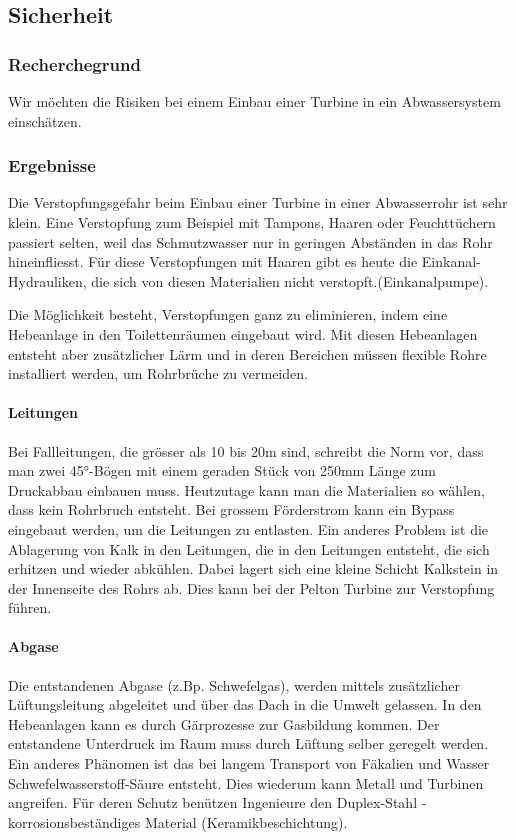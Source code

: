 \subsection{Sicherheit}


\subsubsection{Recherchegrund}
Wir möchten die Risiken bei einem Einbau einer Turbine in ein Abwassersystem einschätzen.

\subsubsection{Ergebnisse}
Die Verstopfungsgefahr beim Einbau einer Turbine in einer Abwasserrohr ist sehr klein. 
Eine Verstopfung zum Beispiel mit Tampons, Haaren oder Feuchttüchern passiert selten, weil das Schmutzwasser nur in geringen Abständen in das Rohr hineinfliesst. 
Für diese Verstopfungen mit Haaren gibt es heute die Einkanal-Hydrauliken, die sich von diesen Materialien nicht verstopft.(Einkanalpumpe).\cite{Homa-Pumpen}

Die Möglichkeit besteht,  Verstopfungen ganz zu eliminieren, indem eine Hebeanlage in den Toilettenräumen eingebaut wird. Mit diesen Hebeanlagen entsteht aber zusätzlicher Lärm und in deren Bereichen müssen flexible Rohre installiert werden, um Rohrbrüche zu vermeiden. \cite{Hebeanlagen,Tipp zum Bau}

\paragraph{Leitungen}
Bei Fallleitungen, die grösser als 10 bis 20\si{m} sind, schreibt die Norm vor, dass man zwei 45°-Bögen mit einem geraden Stück von 250\si{mm} Länge zum Druckabbau einbauen muss. Heutzutage kann man die Materialien so wählen, dass kein Rohrbruch entsteht. Bei grossem Förderstrom kann ein Bypass eingebaut werden, um die Leitungen zu entlasten. 
Ein anderes Problem ist die Ablagerung von Kalk in den Leitungen, die in den Leitungen entsteht, die sich erhitzen und wieder abkühlen. Dabei lagert sich eine kleine Schicht Kalkstein in der Innenseite des Rohrs ab. Dies kann bei der Pelton Turbine zur Verstopfung führen. \cite{BauNetz Media,Mediagon,Kreiselpumpenlexikon}

\paragraph{Abgase}
Die entstandenen Abgase (z.Bp. Schwefelgas), werden mittels zusätzlicher Lüftungsleitung abgeleitet und über das Dach in die Umwelt gelassen. In den Hebeanlagen kann es durch Gärprozesse zur Gasbildung kommen. Der entstandene Unterdruck im Raum muss durch Lüftung selber geregelt werden. 
Ein anderes Phänomen ist das bei langem Transport von Fäkalien und Wasser Schwefelwasserstoff-Säure entsteht. Dies wiederum kann Metall und Turbinen angreifen. Für deren Schutz benützen Ingenieure den Duplex-Stahl - korrosionsbeständiges Material (Keramikbeschichtung).\cite{Water & Wastewater}



